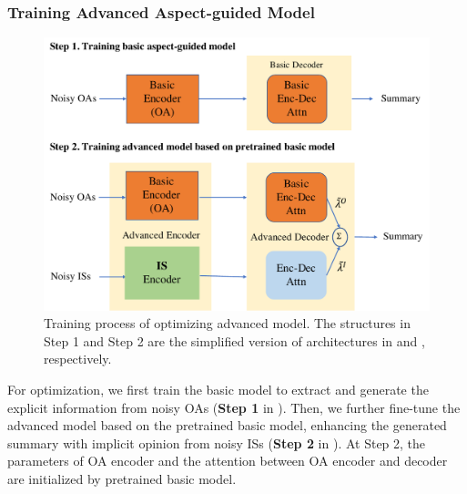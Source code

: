 \subsubsection{Training Advanced Aspect-guided Model}
\begin{figure}[th]
	\centering
	\includegraphics[width=1\linewidth]{./flow.pdf}
	\caption{Training process of optimizing advanced model. The structures in Step 1 and Step 2 are the simplified version of architectures in  and , respectively.}
	\label{fig:flow}
\end{figure}

For optimization, we first train the basic model to extract and generate the explicit information from noisy OAs ({\bf Step 1} in ).
Then, we further fine-tune the advanced model based on the pretrained
basic model, enhancing the generated summary with
implicit opinion from noisy ISs ({\bf Step 2} in ).
At Step 2, the parameters of OA encoder and the attention between OA encoder and decoder are initialized by pretrained basic model.




